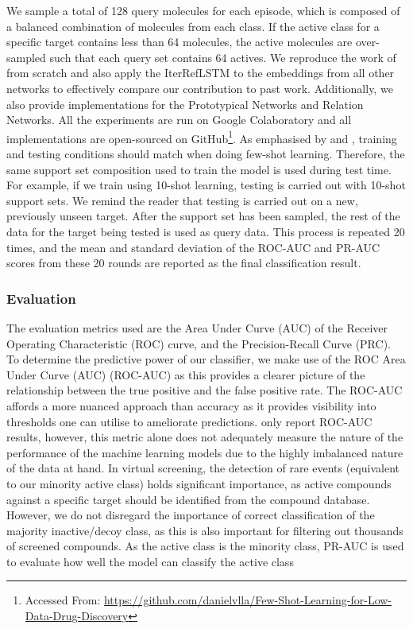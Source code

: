 We sample a total of 128 query molecules for each episode, which is composed of a balanced combination of molecules from each class. If the active class for a specific target contains less than 64 molecules, the active molecules are over-sampled such that each query set contains 64 actives. We reproduce the work of \citet{altae2017low} from scratch and also apply the IterRefLSTM to the embeddings from all other networks to effectively compare our contribution to past work. Additionally, we also provide implementations for the Prototypical Networks and Relation Networks. All the experiments are run on Google Colaboratory and all implementations are open-sourced on GitHub\footnote{Accessed From: \url{https://github.com/danielvlla/Few-Shot-Learning-for-Low-Data-Drug-Discovery}}. As  emphasised by \citet{vinyals2016matching} and \citet{snell2017prototypical}, training and testing conditions should match when doing few-shot learning. Therefore, the same support set composition used to train the model is used during test time. For example, if we train using 10-shot learning, testing is carried out with 10-shot support sets. We remind the reader that testing is carried out on a new, previously unseen target. After the support set has been sampled, the rest of the data for the target being tested is used as query data. This process is repeated 20 times, and the mean and standard deviation of the ROC-AUC and PR-AUC scores from these 20 rounds are reported as the final classification result.

\subsubsection{Evaluation}

The evaluation metrics used are the Area Under Curve (AUC) of the Receiver Operating Characteristic (ROC) curve, and the Precision-Recall Curve (PRC). To determine the predictive power of our classifier, we make use of the ROC Area Under Curve (AUC) (ROC-AUC) as this provides a clearer picture of the relationship between the true positive and the false positive rate. The ROC-AUC affords a more nuanced approach than accuracy as it provides visibility into thresholds one can utilise to ameliorate predictions. \citet{altae2017low} only report ROC-AUC results, however, this metric alone does not adequately measure the nature of the performance of the machine learning models due to the highly imbalanced nature of the data at hand. In virtual screening, the detection of rare events (equivalent to our minority active class) holds significant importance, as active compounds against a specific target should be identified from the compound database. However, we do not disregard the importance of correct classification of the majority inactive/decoy class, as this is also important for filtering out thousands of screened compounds. As the active class is the minority class, PR-AUC is used to evaluate how well the model can classify the active class

